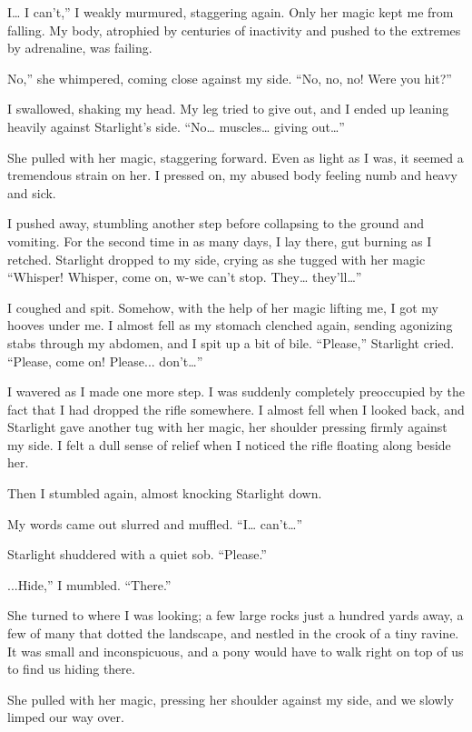 \leavevmode{}I… I can’t,” I weakly murmured, staggering again. Only her magic kept me from falling. My body, atrophied by centuries of inactivity and pushed to the extremes by adrenaline, was failing.

\leavevmode{}No,” she whimpered, coming close against my side. “No, no, no! Were you hit?”

I swallowed, shaking my head. My leg tried to give out, and I ended up leaning heavily against Starlight’s side. “No… muscles… giving out…”

She pulled with her magic, staggering forward. Even as light as I was, it seemed a tremendous strain on her. I pressed on, my abused body feeling numb and heavy and sick.

I pushed away, stumbling another step before collapsing to the ground and vomiting. For the second time in as many days, I lay there, gut burning as I retched. Starlight dropped to my side, crying as she tugged with her magic “Whisper! Whisper, come on, w-we can’t stop. They… they’ll…”

I coughed and spit. Somehow, with the help of her magic lifting me, I got my hooves under me. I almost fell as my stomach clenched again, sending agonizing stabs through my abdomen, and I spit up a bit of bile. “Please,” Starlight cried. “Please, come on! Please... don’t…”

I wavered as I made one more step. I was suddenly completely preoccupied by the fact that I had dropped the rifle somewhere. I almost fell when I looked back, and Starlight gave another tug with her magic, her shoulder pressing firmly against my side. I felt a dull sense of relief when I noticed the rifle floating along beside her.

Then I stumbled again, almost knocking Starlight down.

My words came out slurred and muffled. “I… can’t…”

Starlight shuddered with a quiet sob. “Please.”

\leavevmode{}...Hide,” I mumbled. “There.”

She turned to where I was looking; a few large rocks just a hundred yards away, a few of many that dotted the landscape, and nestled in the crook of a tiny ravine. It was small and inconspicuous, and a pony would have to walk right on top of us to find us hiding there.

She pulled with her magic, pressing her shoulder against my side, and we slowly limped our way over.

